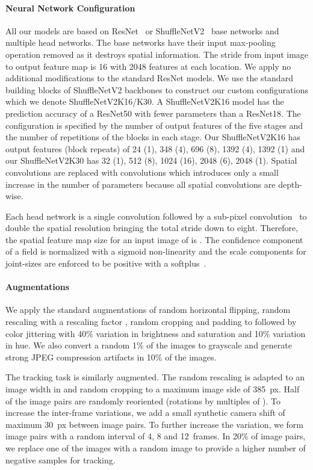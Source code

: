 \documentclass[journal]{IEEEtran}
\begin{document}
\paragraph{Neural Network Configuration}
All our models are based on ResNet~\cite{he2016deep} or
ShuffleNetV2~\cite{ma2018shufflenet} base networks and
multiple head networks. The base networks have their input max-pooling
operation removed as it destroys spatial information. The stride from
input image to output feature map is 16 with 2048 features at each
location. We apply no additional modifications to the standard
ResNet models. We use the standard building blocks of
ShuffleNetV2 backbones to construct our custom configurations which we
denote ShuffleNetV2K16/K30. A ShuffleNetV2K16 model has the prediction
accuracy of a ResNet50 with fewer parameters than a ResNet18. The
configuration is specified by the number of output features of the five
stages and the number of repetitions of the blocks in each stage. Our
ShuffleNetV2K16 has output features (block repeats) of 24 (1), 348 (4),
696 (8), 1392 (4), 1392 (1) and our ShuffleNetV2K30 has 32 (1), 512 (8),
1024 (16), 2048 (6), 2048 (1). Spatial  convolutions are
replaced with  convolutions which introduces only a small increase
in the number of parameters because all spatial convolutions are depth-wise.

Each head network is a single  convolution followed
by a sub-pixel convolution~\cite{shi2016real} to double the spatial resolution
bringing the total stride down to eight.
Therefore, the spatial feature map size for an input image of
 is .
The confidence component of a field is normalized with a sigmoid non-linearity
and the scale components for joint-sizes are enforced to be positive with
a softplus~\cite{dugas2000incorporating}.


\paragraph{Augmentations}
We apply the standard augmentations of random horizontal flipping,
random rescaling with a rescaling factor ,
random cropping and padding to  followed by color jittering
with 40\% variation in brightness and saturation and 10\% variation in hue.
We also convert a
random 1\% of the images to grayscale and generate strong JPEG compression
artifacts in 10\% of the images.

The tracking task is similarly augmented. The random rescaling is adapted
to an image width in 
and random cropping to a maximum image side of 385~px. Half of the image pairs
are randomly reoriented (rotations by multiples of ).
To increase the inter-frame variations, we add a small synthetic camera shift
of maximum 30~px between image pairs.
To further increase the variation, we form image pairs with a random interval of 4, 8 and
12~frames.
In 20\% of image pairs, we replace one of the images with a random image
to provide a higher number of negative samples for tracking.
\end{document}
